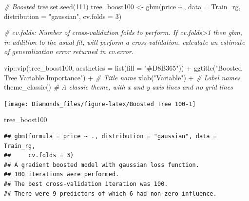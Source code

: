 \documentclass[
]{article}
\newenvironment{Shaded}{\begin{snugshade}}{\end{snugshade}}
\newcommand{\AttributeTok}[1]{\textcolor[rgb]{0.77,0.63,0.00}{#1}}
\newcommand{\CommentTok}[1]{\textcolor[rgb]{0.56,0.35,0.01}{\textit{#1}}}
\newcommand{\ConstantTok}[1]{\textcolor[rgb]{0.00,0.00,0.00}{#1}}
\newcommand{\DecValTok}[1]{\textcolor[rgb]{0.00,0.00,0.81}{#1}}
\newcommand{\FunctionTok}[1]{\textcolor[rgb]{0.00,0.00,0.00}{#1}}
\newcommand{\NormalTok}[1]{#1}
\newcommand{\OtherTok}[1]{\textcolor[rgb]{0.56,0.35,0.01}{#1}}
\newcommand{\SpecialCharTok}[1]{\textcolor[rgb]{0.00,0.00,0.00}{#1}}
\newcommand{\StringTok}[1]{\textcolor[rgb]{0.31,0.60,0.02}{#1}}
\begin{document}
\begin{Shaded}
\begin{Highlighting}[]
\CommentTok{\# Boosted tree}
\FunctionTok{set.seed}\NormalTok{(}\DecValTok{111}\NormalTok{)}
\NormalTok{tree\_boost100 }\OtherTok{\textless{}{-}} \FunctionTok{gbm}\NormalTok{(price }\SpecialCharTok{\textasciitilde{}}\NormalTok{., }\AttributeTok{data =}\NormalTok{ Train\_rg, }\AttributeTok{distribution =} \StringTok{"gaussian"}\NormalTok{, }\AttributeTok{cv.folds =} \DecValTok{3}\NormalTok{)}

\CommentTok{\# cv.folds: Number of cross{-}validation folds to perform. If cv.folds\textgreater{}1 then gbm, in addition to the usual fit, will perform a cross{-}validation, calculate an estimate of generalization error returned in cv.error.}

\NormalTok{vip}\SpecialCharTok{::}\FunctionTok{vip}\NormalTok{(tree\_boost100, }\AttributeTok{aesthetics =} \FunctionTok{list}\NormalTok{(}\AttributeTok{fill =} \StringTok{"\#D8B365"}\NormalTok{)) }\SpecialCharTok{+}
  \FunctionTok{ggtitle}\NormalTok{(}\StringTok{"Boosted Tree Variable Importance"}\NormalTok{) }\SpecialCharTok{+} \CommentTok{\# Title name}
  \FunctionTok{xlab}\NormalTok{(}\StringTok{"Variable"}\NormalTok{) }\SpecialCharTok{+} \CommentTok{\# Label names}
  \FunctionTok{theme\_classic}\NormalTok{() }\CommentTok{\# A classic theme, with x and y axis lines and no grid lines}
\end{Highlighting}
\end{Shaded}

\begin{center}\texttt{[image: Diamonds\_files/figure-latex/Boosted Tree 100-1]} \end{center}

\begin{Shaded}
\begin{Highlighting}[]
\NormalTok{tree\_boost100}
\end{Highlighting}
\end{Shaded}

\begin{verbatim}
## gbm(formula = price ~ ., distribution = "gaussian", data = Train_rg,
##     cv.folds = 3)
## A gradient boosted model with gaussian loss function.
## 100 iterations were performed.
## The best cross-validation iteration was 100.
## There were 9 predictors of which 6 had non-zero influence.
\end{verbatim}

\begin{Shaded}
\end{Shaded}
\end{document}
